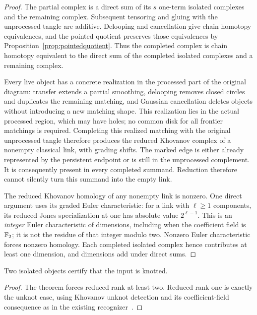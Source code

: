 \begin{proof}
The partial complex is a direct sum of its $s$ one-term isolated complexes
and the remaining complex.  Subsequent tensoring and gluing with the
unprocessed tangle are additive.  Delooping and cancellation give chain
homotopy equivalences, and the pointed quotient preserves those equivalences
by Proposition~\ref{prop:pointedquotient}.  Thus the completed complex is
chain homotopy equivalent to the direct sum of the completed isolated
complexes and a remaining complex.

Every live object has a concrete realization in the processed part of the
original diagram: transfer extends a partial smoothing, delooping removes
closed circles and duplicates the remaining matching, and Gaussian
cancellation deletes objects without introducing a new matching shape.
This realization lies in the actual processed region, which may have holes;
no common disk for all frontier matchings is required.  Completing this
realized matching with the original unprocessed tangle therefore produces
the reduced Khovanov complex of a nonempty classical link, with grading
shifts.  The marked edge is either
already represented by the persistent endpoint or is still in the
unprocessed complement.  It is consequently present in every completed
summand.  Reduction therefore cannot silently turn this summand into the
empty link.

The reduced Khovanov homology of any nonempty link is nonzero.  One direct
argument uses its graded Euler characteristic: for a link with $\ell\geq1$
components, its reduced Jones specialization at one has absolute value
$2^{\ell-1}$.  This is an \emph{integer} Euler characteristic of dimensions,
including when the coefficient field is $\mathbb{F}_2$; it is not the residue of that
integer modulo two.  Nonzero Euler characteristic forces nonzero homology.
Each completed isolated complex hence contributes at least one dimension,
and dimensions add under direct sums.
\end{proof}

\begin{corollary}
Two isolated objects certify that the input is knotted.
\end{corollary}

\begin{proof}
The theorem forces reduced rank at least two.  Reduced rank one is exactly
the unknot case, using Khovanov unknot detection and its coefficient-field
consequence as in the existing recognizer~\cite{kronheimermrowka,repository}.
\end{proof}

